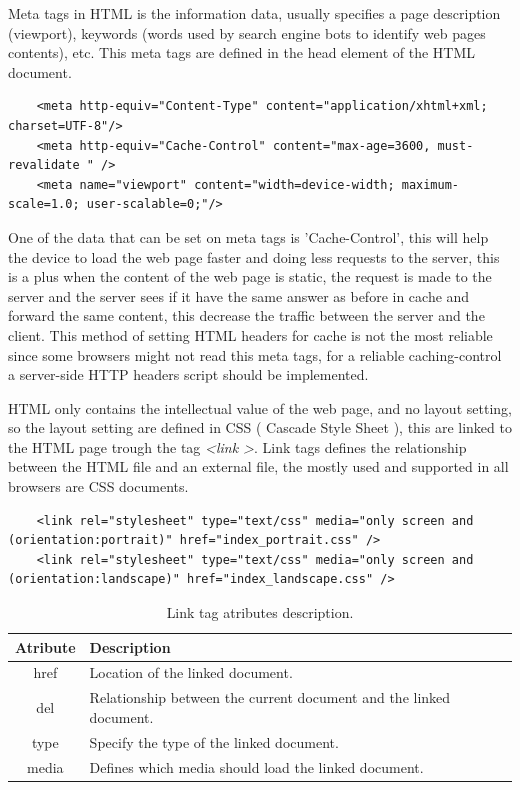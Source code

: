 Meta tags in HTML is the information data, usually specifies a page description (viewport), keywords (words used by search engine bots to identify web pages contents), etc. This meta tags are defined in the head element of the HTML document. 

\begin{lstlisting}
	<meta http-equiv="Content-Type" content="application/xhtml+xml; charset=UTF-8"/>
	<meta http-equiv="Cache-Control" content="max-age=3600, must-revalidate " />
	<meta name="viewport" content="width=device-width; maximum-scale=1.0; user-scalable=0;"/>
\end{lstlisting}

One of the data that can be set on meta tags is 'Cache-Control', this will help the device to load the web page faster and doing less requests to the server, this is a plus when the content of the web page is static, the request is made to the server and the server sees if it have the same answer as before in cache and forward the same content, this decrease the traffic between the server and the client. This method of setting HTML headers for cache is not the most reliable since some browsers might not read this meta tags, for a reliable caching-control a server-side HTTP headers script should be implemented.

HTML only contains the intellectual value of the web page, and no layout setting, so the layout setting are defined in CSS ( Cascade Style Sheet ), this are linked to the HTML page trough the tag \textit{\textless link \textgreater}.  Link tags defines the relationship between the HTML file and an external file, the mostly used and supported in all browsers are CSS documents.

\begin{lstlisting}
	<link rel="stylesheet" type="text/css" media="only screen and (orientation:portrait)" href="index_portrait.css" />
	<link rel="stylesheet" type="text/css" media="only screen and (orientation:landscape)" href="index_landscape.css" />
\end{lstlisting}

\begin{table}[h!]
\begin{tabular}{ | c | l | }
\hline
\textbf{Atribute} & \textbf{Description} \\ \hline
href & Location of the linked document. \\ \hline
del & Relationship between the current document and the linked document. \\ \hline
type & Specify the type of the linked document. \\ \hline
media & Defines which media should load the linked document. \\ \hline
\end{tabular}
\caption{Link tag atributes description.}
\end{table}

